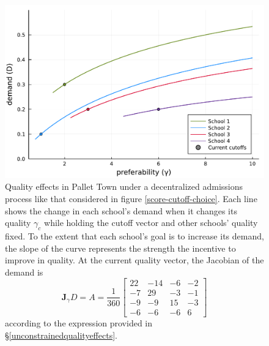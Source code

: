 \documentclass[12pt]{article}
\theoremstyle{definition}
\begin{document}
\begin{figure}
\begin{center}\includegraphics[width=\linewidth, ]{plots/vary-gamma-demand.pdf}\end{center}
\captionsetup{singlelinecheck=off}
    \caption[.]{Quality effects in Pallet Town under a decentralized admissions process like that considered in figure \ref{score-cutoff-choice}. Each line shows the change in each school’s demand when it changes its quality $\gamma_c$ while holding the cutoff vector and other schools’ quality fixed. To the extent that each school's goal is to increase its demand, the slope of the curve represents the strength the incentive to improve in quality. At the current quality vector, the Jacobian of the demand is
    \begin{equation*}
    \mathbf{J}_\gamma D = A = \frac{1}{360}
    \begin{bmatrix}
22 & -14 & -6&  -2\\
 -7   &29  &-3  &-1\\
 -9   &-9  &15  &-3\\
 -6   &-6&  -6  & 6
    \end{bmatrix}
    \end{equation*} 
    according to the expression provided in \S\ref{unconstrainedqualityeffects}. }
\label{vary-gamma-demand}
\end{figure}
\end{document}
